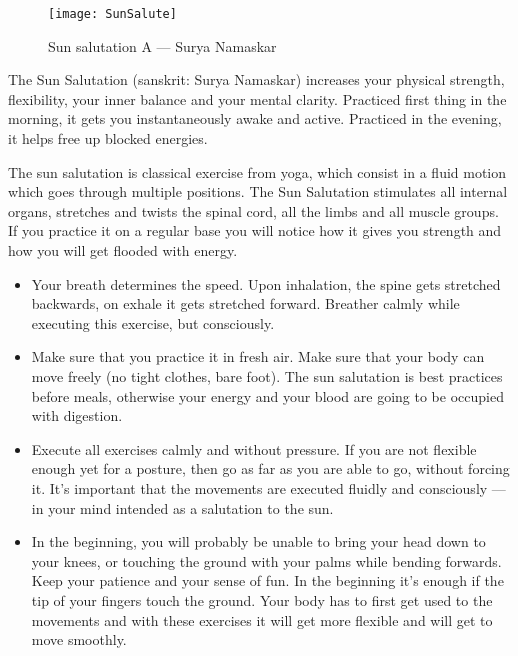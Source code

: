 \documentclass[../Book.Stress_regulation.tex]{subfiles}
\begin{document}
\label{Ex:SunSalutation}
\begin{figure}[htb!]
\texttt{[image: SunSalute]}\label{sf:yoga}
\caption{Sun salutation A --- Surya Namaskar}
\end{figure}


The Sun Salutation (sanskrit: Surya Namaskar) increases your physical strength, flexibility, your inner balance and your mental clarity.
Practiced first thing in the morning, it gets you instantaneously awake and active.
Practiced in the evening, it helps free up blocked energies.

The sun salutation is classical exercise from yoga, which consist in a fluid motion which goes through multiple positions.
The Sun Salutation stimulates all internal organs, stretches and twists the spinal cord, all the limbs and all muscle groups.
If you practice it on a regular base you will notice how it gives you strength and how you will get flooded with energy.

\begin{itemize}
\item Your breath determines the speed.
  Upon inhalation, the spine gets stretched backwards, on exhale it gets stretched forward.
  Breather calmly while executing this exercise, but consciously.
\item Make sure that you practice it in fresh air.
  Make sure that your body can move freely (no tight clothes, bare foot).
  The sun salutation is best practices before meals, otherwise your energy and your blood are going to be occupied with digestion.
\item Execute all exercises calmly and without pressure. If you are not flexible enough yet for a posture, then go as far as you are able to go, without forcing it.
  It's important that the movements are executed fluidly and consciously --- in your mind intended as a salutation to the sun.
\item In the beginning, you will probably be unable to bring your head down to your knees, or touching the ground with your palms while bending forwards.
  Keep your patience and your sense of fun. In the beginning it's enough if the tip of your fingers touch the ground.
  Your body has to first get used to the movements and with these exercises it will get more flexible and will get to move smoothly.
\end{itemize}
\end{document}
